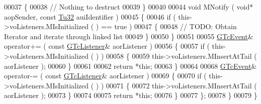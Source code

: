 \begin{DoxyCode}
00037          \{
00038             \textcolor{comment}{// Nothing to destruct}
00039          \}
00040 
00044          \textcolor{keywordtype}{void} MNotify ( \textcolor{keywordtype}{void}* aopSender, \textcolor{keyword}{const} \mbox{\hyperlink{namespace_g_n_common_a941b527ef318f318aed7903dc832b7e4}{Tu32}} auiIdentifier )
00045          \{
00046             \textcolor{keywordflow}{if} ( this->voListeners.MIsInitialized ( ) == true )
00047             \{
00048                \textcolor{comment}{// TODO: Obtain Iterator and iterate through linked list}
00049             \}
00050          \}
00051 
00055          \mbox{\hyperlink{class_g_n_common_1_1_n_component_1_1_g_tc_event}{GTcEvent}}& operator+= ( \textcolor{keyword}{const} \mbox{\hyperlink{class_g_n_common_1_1_n_component_1_1_g_tc_listener}{GTcListener}}& aorListener )
00056          \{
00057             \textcolor{keywordflow}{if} ( this->voListeners.MIsInitialized ( ) )
00058             \{
00059                this->voListeners.MInsertAtTail ( aorListener );
00060             \}
00061 
00062             \textcolor{keywordflow}{return} *\textcolor{keyword}{this};
00063          \}
00064 
00068          \mbox{\hyperlink{class_g_n_common_1_1_n_component_1_1_g_tc_event}{GTcEvent}}& operator-= ( \textcolor{keyword}{const} \mbox{\hyperlink{class_g_n_common_1_1_n_component_1_1_g_tc_listener}{GTcListener}}& aorListener )
00069          \{
00070             \textcolor{keywordflow}{if} ( this->voListeners.MIsInitialized ( ) )
00071             \{
00072                this->voListeners.MInsertAtTail ( aorListener );
00073             \}
00074 
00075             \textcolor{keywordflow}{return} *\textcolor{keyword}{this};
00076          \}
00077       \};
00078    \}
00079 \}
\end{DoxyCode}
